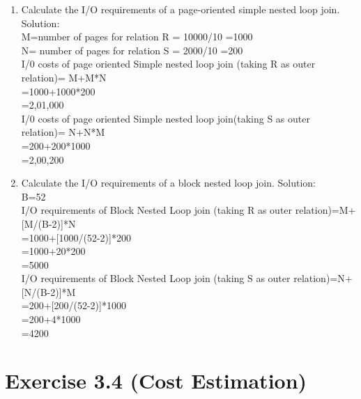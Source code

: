 \documentclass[10pt]{article}
\begin{document}
		\begin{enumerate}
			\item Calculate the I/O requirements of a page-oriented simple nested loop join.
				Solution:
			\\M=number of pages for relation R
			  = 10000/10
			  =1000
			\\N= number of pages for relation S
			  = 2000/10
			  =200
			  \\I/0 costs of page oriented Simple nested loop join (taking R as outer relation)= M+M*N
			        \\=1000+1000*200
			       \\ =2,01,000
			 \\I/0 costs of page oriented Simple nested loop join(taking S as outer relation)= N+N*M
			        \\=200+200*1000
			       \\ =2,00,200
			\bigskip
			
			
			\item Calculate the I/O requirements of a block nested loop join.
			Solution:
			    \\B=52
			    \\I/O requirements of Block Nested Loop join (taking R as outer relation)=M+[M/(B-2)]*N
			    \\=1000+[1000/(52-2)]*200
			    \\=1000+20*200
			    \\=5000
			     \\I/O requirements of Block Nested Loop join (taking S as outer relation)=N+[N/(B-2)]*M
			    \\=200+[200/(52-2)]*1000
			    \\=200+4*1000
			    \\=4200
		\end{enumerate}

	\clearpage

	\section*{Exercise 3.4 (Cost Estimation)}
	
\end{document}
